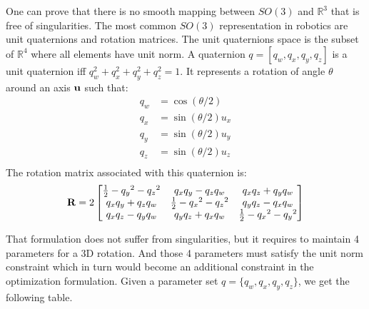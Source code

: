 One can prove that there is no smooth mapping between $SO(3)$ and $\mathbb{R}^3$ that is free of singularities.
The most common $SO(3)$ representation in robotics are unit quaternions and rotation matrices.
The unit quaternions space is the subset of $\mathbb{R}^4$ where all elements have unit norm.
A quaternion $q = [q_w, q_x, q_y, q_z]$ is a unit quaternion iff $q_w^2+q_x^2+q_y^2+q_z^2 = 1$.
It represents a rotation of angle $\theta$ around an axis ${\bf u}$ such that:
\begin{align}
  q_w &= \cos(\theta/2) \\
  q_x &= \sin(\theta/2)u_x \\
  q_y &= \sin(\theta/2)u_y \\
  q_z &= \sin(\theta/2)u_z \\
\end{align}
The rotation matrix associated with this quaternion is:
\begin{equation}
  {\bf R} = 2 \begin{bmatrix}
    \frac{1}{2} - {q_y}^2 - {q_z}^2 &	q_x q_y - q_z q_w &	q_x q_z + q_y q_w \\
    q_x q_y + q_z q_w	& \frac{1}{2} - {q_x}^2 - {q_z}^2 &	q_y q_z - q_x q_w \\
    q_x q_z - q_y q_w &	q_y q_z + q_x q_w	& \frac{1}{2} - {q_x}^2 - {q_y}^2 \\
  \end{bmatrix}
\end{equation}

That formulation does not suffer from singularities, but it requires to maintain 4 parameters for a 3D rotation.
And those 4 parameters must satisfy the unit norm constraint which in turn would become an additional constraint in the optimization formulation.
Given a parameter set $q = \{ q_w, q_x, q_y, q_z\}$, we get the following table.

